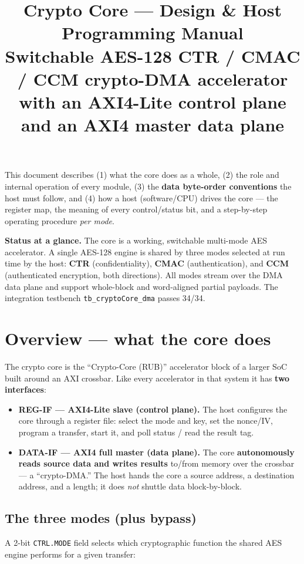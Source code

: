 \documentclass[11pt,a4paper]{article}
\title{\textbf{Crypto Core --- Design \& Host Programming Manual}\\[4pt]
       \large Switchable AES-128 \textbf{CTR / CMAC / CCM} crypto-DMA accelerator with an
       AXI4-Lite control plane and an AXI4 master data plane}
\author{}
\date{}
\newcommand{\bit}[1]{\texttt{#1}}
\begin{document}
\maketitle

\noindent
This document describes (1) what the core does as a whole, (2) the role and internal
operation of every module, (3) the \textbf{data byte-order conventions} the host must follow,
and (4) how a host (software/CPU) drives the core --- the register map, the meaning of every
control/status bit, and a step-by-step operating procedure \emph{per mode}.

\medskip
\noindent\textbf{Status at a glance.} The core is a working, switchable multi-mode AES
accelerator. A single AES-128 engine is shared by three modes selected at run time by the
host: \textbf{CTR} (confidentiality), \textbf{CMAC} (authentication), and \textbf{CCM}
(authenticated encryption, both directions). All modes stream over the DMA data plane and
support whole-block and word-aligned partial payloads. The integration testbench
\texttt{tb\_cryptoCore\_dma} passes 34/34.

\tableofcontents
\bigskip

\section{Overview --- what the core does}

The crypto core is the ``Crypto-Core (RUB)'' accelerator block of a larger SoC built around
an AXI crossbar. Like every accelerator in that system it has \textbf{two interfaces}:

\begin{itemize}[nosep]
  \item \textbf{REG-IF --- AXI4-Lite slave (control plane).} The host configures the core
        through a register file: select the mode and key, set the nonce/IV, program a
        transfer, start it, and poll status / read the result tag.
  \item \textbf{DATA-IF --- AXI4 full master (data plane).} The core \textbf{autonomously
        reads source data and writes results} to/from memory over the crossbar --- a
        ``crypto-DMA.'' The host hands the core a source address, a destination address, and a
        length; it does \emph{not} shuttle data block-by-block.
\end{itemize}

\subsection{The three modes (plus bypass)}
A 2-bit \bit{CTRL.MODE} field selects which cryptographic function the shared AES engine
performs for a given transfer:
\end{document}
